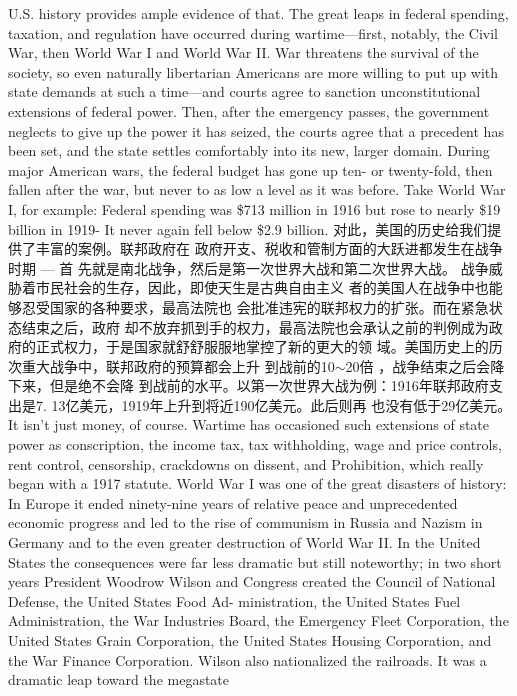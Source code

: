 \begin{paracol}{2}
\switchcolumn*
U.S. history provides ample evidence of that. The great
leaps in federal spending, taxation, and regulation have occurred during wartime---first, notably, the Civil War, then
World War I and World War II. War threatens the survival of
the society, so even naturally libertarian Americans are more
willing to put up with state demands at such a time---and
courts agree to sanction unconstitutional extensions of federal
power. Then, after the emergency passes, the government neglects to give up the power it has seized, the courts agree that
a precedent has been set, and the state settles comfortably into
its new, larger domain. During major American wars, the federal budget has gone up ten- or twenty-fold, then fallen after
the war, but never to as low a level as it was before. Take World
War I, for example: Federal spending was \$713 million in
1916 but rose to nearly \$19 billion in 1919- It never again fell
below \$2.9 billion.
\switchcolumn
对此，美国的历史给我们提供了丰富的案例。联邦政府在
政府开支、税收和管制方面的大跃进都发生在战争时期 --- 首
先就是南北战争，然后是第一次世界大战和第二次世界大战。
战争威胁着市民社会的生存，因此，即使天生是古典自由主义
者的美国人在战争中也能够忍受国家的各种要求，最高法院也
会批准违宪的联邦权力的扩张。而在紧急状态结束之后，政府
却不放弃抓到手的权力，最高法院也会承认之前的判例成为政
府的正式权力，于是国家就舒舒服服地掌控了新的更大的领
域。美国历史上的历次重大战争中，联邦政府的预算都会上升
到战前的10$\sim$20倍 ，战争结束之后会降下来，但是绝不会降
到战前的水平。以第一次世界大战为例：1916年联邦政府支
出是7. 13亿美元，1919年上升到将近190亿美元。此后则再
也没有低于29亿美元。
\switchcolumn*
It isn't just money, of course. Wartime has occasioned such
extensions of state power as conscription, the income tax, tax
withholding, wage and price controls, rent control, censorship,
crackdowns on dissent, and Prohibition, which really began
with a 1917 statute. World War I was one of the great disasters
of history: In Europe it ended ninety-nine years of relative peace
and unprecedented economic progress and led to the rise of
communism in Russia and Nazism in Germany and to the even
greater destruction of World War II. In the United States the consequences were far less dramatic but still noteworthy; in two
short years President Woodrow Wilson and Congress created
the Council of National Defense, the United States Food Ad-
ministration, the United States Fuel Administration, the War
Industries Board, the Emergency Fleet Corporation, the United
States Grain Corporation, the United States Housing Corporation, and the War Finance Corporation. Wilson also nationalized the railroads. It was a dramatic leap toward the megastate

\end{paracol}
